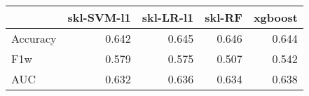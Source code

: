 \begin{tabular}{lrrrr}
\toprule
{} &  skl-SVM-l1 &  skl-LR-l1 &  skl-RF &  xgboost \\
\midrule
Accuracy &       0.642 &      0.645 &   0.646 &    0.644 \\
F1w      &       0.579 &      0.575 &   0.507 &    0.542 \\
AUC      &       0.632 &      0.636 &   0.634 &    0.638 \\
\bottomrule
\end{tabular}
